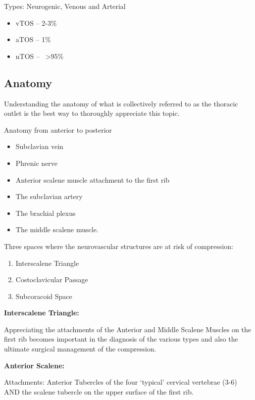 \documentclass[
]{book}
\begin{document}
Types: Neurogenic, Venous and Arterial~

\begin{itemize}
\item
  vTOS -- 2-3\%
\item
  aTOS -- 1\%
\item
  nTOS --~ \textgreater95\% \citep{humphries124ThoracicOutlet2019}
\end{itemize}

\hypertarget{anatomy}{%
\subsection{Anatomy}\label{anatomy}}

Understanding the anatomy of what is collectively referred to as the
thoracic outlet is the best way to thoroughly appreciate this topic.

Anatomy from anterior to posterior

\begin{itemize}
\item
  Subclavian vein
\item
  Phrenic nerve
\item
  Anterior scalene muscle attachment to the first rib
\item
  The subclavian artery
\item
  The brachial plexus
\item
  The middle scalene muscle.
\end{itemize}

Three spaces where the neurovascular structures are at risk of
compression:

\begin{enumerate}
\def\labelenumi{\arabic{enumi}.}
\item
  Interscalene Triangle~
\item
  Costoclavicular Passage~\citep{garygwindAnatomicExposuresVascular2013}
\item
  Subcoracoid Space \citep{garygwindAnatomicExposuresVascular2013}
\end{enumerate}

\textbf{Interscalene Triangle:}

Appreciating the attachments of the Anterior and Middle Scalene Muscles
on the first rib becomes important in the diagnosis of the various types
and also the ultimate surgical management of the compression.

\textbf{Anterior Scalene:}

Attachments: Anterior Tubercles of the four `typical' cervical vertebrae
(3-6) AND the scalene tubercle on the upper surface of the first rib.
\end{document}
